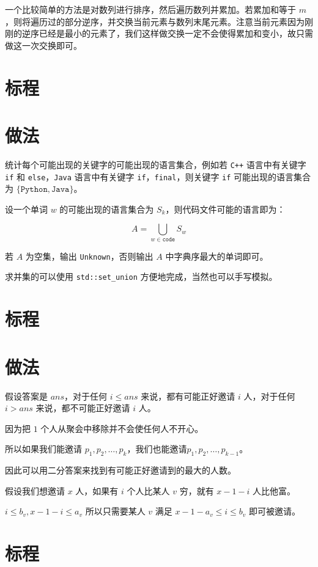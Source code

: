 \documentclass{../cpct/ctsol}
\begin{document}
一个比较简单的方法是对数列进行排序，然后遍历数列并累加。若累加和等于 $m$，则将遍历过的部分逆序，并交换当前元素与数列末尾元素。注意当前元素因为刚刚的逆序已经是最小的元素了，我们这样做交换一定不会使得累加和变小，故只需做这一次交换即可。

\section*{标程}


\makesolution
\section*{做法}

统计每个可能出现的关键字的可能出现的语言集合，例如若 \texttt{C++} 语言中有关键字 \texttt{if} 和 \texttt{else}，\texttt{Java} 语言中有关键字 \texttt{if}，\texttt{final}，则关键字 \texttt{if} 可能出现的语言集合为 $\{\texttt{Python}, \texttt{Java}\}$。

设一个单词 $w$ 的可能出现的语言集合为 $S_k$，则代码文件可能的语言即为：

$$A = \bigcup\limits_{w \in \texttt{code}} S_w$$

若 $A$ 为空集，输出 \texttt{Unknown}，否则输出 $A$ 中字典序最大的单词即可。

求并集的可以使用 \lstinline{std::set_union} 方便地完成，当然也可以手写模拟。

\section*{标程}


\makesolution
\section*{做法}

假设答案是 $ans$，对于任何 $i \leq ans$ 来说，都有可能正好邀请 $i$ 人，对于任何 $i > ans$ 来说，都不可能正好邀请 $i$ 人。

因为把 $1$ 个人从聚会中移除并不会使任何人不开心。

所以如果我们能邀请 $p_1,p_2,\dots,p_k$，我们也能邀请$p_1,p_2,\dots,p_{k-1}$。

因此可以用二分答案来找到有可能正好邀请到的最大的人数。

假设我们想邀请 $x$ 人，如果有 $i$ 个人比某人 $v$ 穷，就有 $x-1-i$ 人比他富。

$i \leq b_v,x-1-i \leq a_v$ 所以只需要某人 $v$ 满足 $x-1-a_v \leq i \leq b_v$ 即可被邀请。

\section*{标程}

\end{document}
